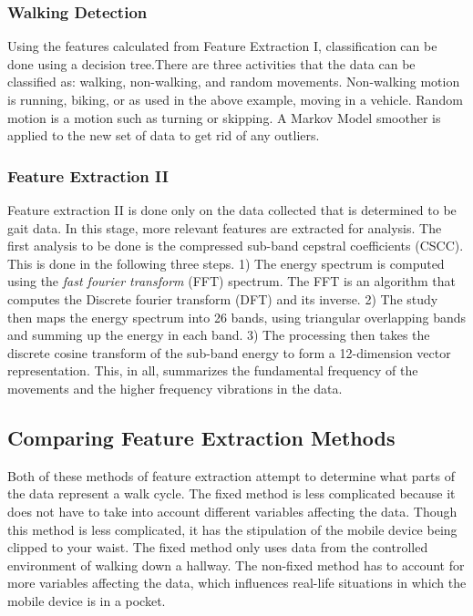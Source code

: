 \documentclass{sig-alternate}
\begin{document}
\subsubsection{Walking Detection} \label{WD}
	Using the features calculated from Feature Extraction I, classification can be done using a decision tree.There are three activities that the data can be classified as: walking, non-walking, and random movements. Non-walking motion is running, biking, or as used in the above example, moving in a vehicle. Random motion is a motion such as turning or skipping. A Markov Model smoother is applied to the new set of data to get rid of any outliers. 
			
\subsubsection{Feature Extraction II}{
	Feature extraction II is done only on the data collected that is determined to be gait data. In this stage, more relevant features are extracted for analysis. The first analysis to be done is the compressed sub-band cepstral coefficients (CSCC). This is done in the following three steps. 1) The energy spectrum is computed using the \textit{fast fourier transform} (FFT) spectrum. The FFT is an algorithm that computes the Discrete fourier transform (DFT) and its inverse. 2) The study then maps the energy spectrum into 26 bands, using triangular overlapping bands and summing up the energy in each band. 3) The processing then takes the discrete cosine transform of the sub-band energy to form a 12-dimension vector representation. This, in all, summarizes the fundamental frequency of the movements and the higher frequency vibrations in the data.~\cite{Sujithra:2012}
}
\subsection{Comparing Feature Extraction Methods}
	Both of these methods of feature extraction attempt to determine what parts of the data represent a walk cycle. The fixed method is less complicated because it does not have to take into account different variables affecting the data. Though this method is less complicated, it has the stipulation of the mobile device being clipped to your waist. The fixed method only uses data from the controlled environment of walking down a hallway. The non-fixed method has to account for more variables affecting the data, which influences real-life situations in which the mobile device is in a pocket.
	
\end{document}
